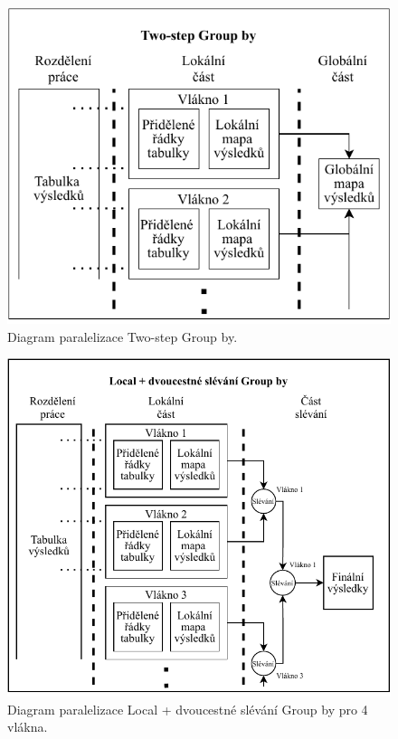 \begin{figure}[!htp]
\includegraphics{../img/diaTwoGr.pdf}\centering
\caption{Diagram paralelizace Two-step Group by.}
\label{figure.diaTwoGr}
\end{figure}

\clearpage

\begin{figure}[!htp]
\includegraphics{../img/diaLocalGr.pdf}\centering
\caption{Diagram paralelizace Local + dvoucestné slévání Group by pro 4 vlákna.}
\label{figure.diaLocalGr}
\end{figure}

